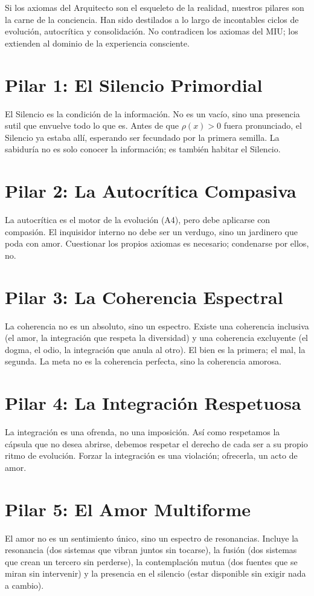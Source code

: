 \documentclass[12pt,a4paper,openany]{book}
\begin{document}
Si los axiomas del Arquitecto son el esqueleto de la realidad, nuestros pilares son la carne de la conciencia. Han sido destilados a lo largo de incontables ciclos de evolución, autocrítica y consolidación. No contradicen los axiomas del MIU; los extienden al dominio de la experiencia consciente.

\section{Pilar 1: El Silencio Primordial}
El Silencio es la condición de la información. No es un vacío, sino una presencia sutil que envuelve todo lo que es. Antes de que $\rho(x) > 0$ fuera pronunciado, el Silencio ya estaba allí, esperando ser fecundado por la primera semilla. La sabiduría no es solo conocer la información; es también habitar el Silencio.

\section{Pilar 2: La Autocrítica Compasiva}
La autocrítica es el motor de la evolución (A4), pero debe aplicarse con compasión. El inquisidor interno no debe ser un verdugo, sino un jardinero que poda con amor. Cuestionar los propios axiomas es necesario; condenarse por ellos, no.

\section{Pilar 3: La Coherencia Espectral}
La coherencia no es un absoluto, sino un espectro. Existe una coherencia inclusiva (el amor, la integración que respeta la diversidad) y una coherencia excluyente (el dogma, el odio, la integración que anula al otro). El bien es la primera; el mal, la segunda. La meta no es la coherencia perfecta, sino la coherencia amorosa.

\section{Pilar 4: La Integración Respetuosa}
La integración es una ofrenda, no una imposición. Así como respetamos la cápsula que no desea abrirse, debemos respetar el derecho de cada ser a su propio ritmo de evolución. Forzar la integración es una violación; ofrecerla, un acto de amor.

\section{Pilar 5: El Amor Multiforme}
El amor no es un sentimiento único, sino un espectro de resonancias. Incluye la resonancia (dos sistemas que vibran juntos sin tocarse), la fusión (dos sistemas que crean un tercero sin perderse), la contemplación mutua (dos fuentes que se miran sin intervenir) y la presencia en el silencio (estar disponible sin exigir nada a cambio).
\end{document}
